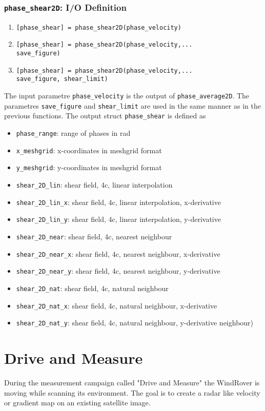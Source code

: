 \documentclass[
12pt,
a4paper,
twoside]
{article}
\begin{document}
\subsubsection{\texttt{phase\_{}shear2D}: I/O Definition}
\begin{enumerate}
\item \verb![phase_shear] = phase_shear2D(phase_velocity)!
\item \verb![phase_shear] = phase_shear2D(phase_velocity,...!\\ \verb!save_figure)!
\item \verb![phase_shear] = phase_shear2D(phase_velocity,...!\\ \verb!save_figure, shear_limit)!
\end{enumerate}
The input parametre \verb!phase_velocity! is the output of \texttt{phase\_{}average2D}. The parametres \verb!save_figure! and \verb!shear_limit! are used in the same manner as in the previous functions.
The output struct \verb!phase_shear! is defined as
\begin{itemize}
\item \verb!phase_range!: range of phases in rad
\item \verb!x_meshgrid!: x-coordinates in meshgrid format
\item \verb!y_meshgrid!: y-coordinates in meshgrid format
\item \verb!shear_2D_lin!: shear field, 4c, linear interpolation
\item \verb!shear_2D_lin_x!: shear field, 4c, linear interpolation, x-derivative
\item \verb!shear_2D_lin_y!: shear field, 4c, linear interpolation, y-derivative
\item \verb!shear_2D_near!:  shear field, 4c, nearest neighbour
\item \verb!shear_2D_near_x!: shear field, 4c, nearest neighbour, x-derivative
\item \verb!shear_2D_near_y!: shear field, 4c, nearest neighbour, y-derivative
\item \verb!shear_2D_nat!: shear field, 4c, natural neighbour
\item \verb!shear_2D_nat_x!: shear field, 4c, natural neighbour, x-derivative
\item \verb!shear_2D_nat_y!: shear field, 4c, natural neighbour, y-derivative neighbour)
\end{itemize}
\newpage
\section{Drive and Measure}
During the measurement campaign called "Drive and Measure" the WindRover is moving while scanning its environment. The goal is to create a radar like velocity or gradient map on an existing satellite image.
\end{document}
